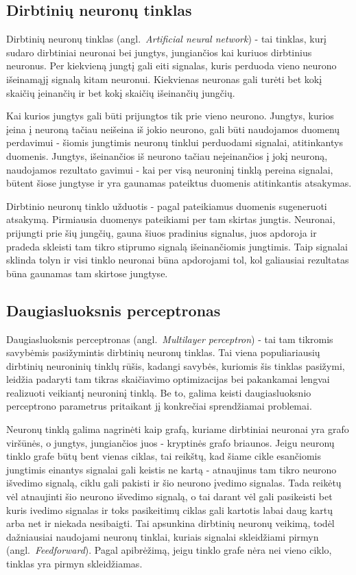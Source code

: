 \documentclass{VUMIFPSbakalaurinis}
\begin{document}
\subsection{Dirbtinių neuronų tinklas}

Dirbtinių neuronų tinklas (angl.~\textit{Artificial neural network}) - tai tinklas, kurį sudaro dirbtiniai neuronai bei jungtys, jungiančios kai kuriuos dirbtinius neuronus.
Per kiekvieną jungtį gali eiti signalas, kuris perduoda vieno neurono išeinamąjį signalą kitam neuronui.
Kiekvienas neuronas gali turėti bet kokį skaičių įeinančių ir bet kokį skaičių išeinančių jungčių.

Kai kurios jungtys gali būti prijungtos tik prie vieno neurono.
Jungtys, kurios įeina į neuroną tačiau neišeina iš jokio neurono, gali būti naudojamos duomenų perdavimui - šiomis jungtimis neuronų tinklui perduodami signalai, atitinkantys duomenis.
Jungtys, išeinančios iš neurono tačiau neįeinančios į jokį neuroną, naudojamos rezultato gavimui - kai per visą neuroninį tinklą pereina signalai, būtent šiose jungtyse ir yra gaunamas pateiktus duomenis atitinkantis atsakymas.

Dirbtinio neuronų tinklo užduotis - pagal pateikiamus duomenis sugeneruoti atsakymą.
Pirmiausia duomenys pateikiami per tam skirtas jungtis.
Neuronai, prijungti prie šių jungčių, gauna šiuos pradinius signalus, juos apdoroja ir pradeda skleisti tam tikro stiprumo signalą išeinančiomis jungtimis.
Taip signalai sklinda tolyn ir visi tinklo neuronai būna apdorojami tol, kol galiausiai rezultatas būna gaunamas tam skirtose jungtyse.



\subsection{Daugiasluoksnis perceptronas}

Daugiasluoksnis perceptronas (angl.~\textit{Multilayer perceptron}) - tai tam tikromis savybėmis pasižymintis dirbtinių neuronų tinklas.
Tai viena populiariausių dirbtinių neuroninių tinklų rūšis, kadangi savybės, kuriomis šis tinklas pasižymi, leidžia padaryti tam tikras skaičiavimo optimizacijas bei pakankamai lengvai realizuoti veikiantį neuroninį tinklą.
Be to, galima keisti daugiasluoksnio perceptrono parametrus pritaikant jį konkrečiai sprendžiamai problemai.

Neuronų tinklą galima nagrinėti kaip grafą, kuriame dirbtiniai neuronai yra grafo viršūnės, o jungtys, jungiančios juos - kryptinės grafo briaunos.
Jeigu neuronų tinklo grafe būtų bent vienas ciklas, tai reikštų, kad šiame cikle esančiomis jungtimis einantys signalai gali keistis ne kartą - atnaujinus tam tikro neurono išvedimo signalą, ciklu gali pakisti ir šio neurono įvedimo signalas.
Tada reikėtų vėl atnaujinti šio neurono išvedimo signalą, o tai darant vėl gali pasikeisti bet kuris ivedimo signalas ir toks pasikeitimų ciklas gali kartotis labai daug kartų arba net ir niekada nesibaigti.
Tai apsunkina dirbtinių neuronų veikimą, todėl dažniausiai naudojami neuronų tinklai, kuriais signalai skleidžiami pirmyn (angl.~\textit{Feedforward}).
Pagal apibrėžimą, jeigu tinklo grafe nėra nei vieno ciklo, tinklas yra pirmyn skleidžiamas.
\end{document}
